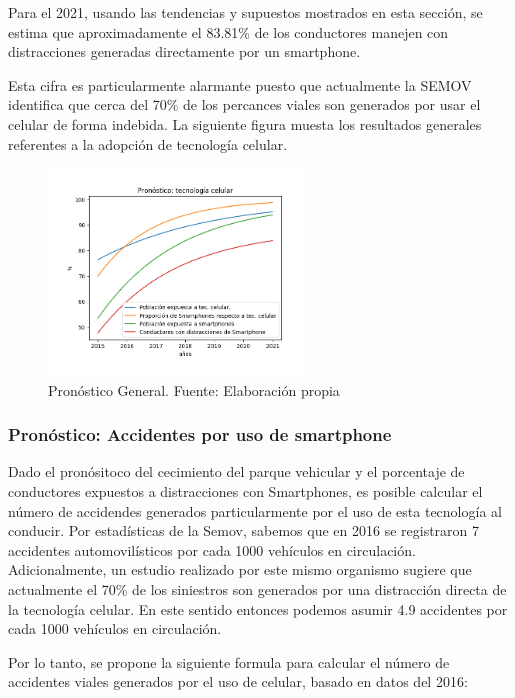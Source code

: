 \documentclass{article}
\begin{document}
Para el 2021, usando las tendencias y supuestos mostrados en esta sección, se estima
que aproximadamente el 83.81\% de los conductores manejen con distracciones generadas
directamente por un smartphone.

Esta cifra es particularmente alarmante puesto que actualmente la SEMOV identifica
que cerca del 70\% de los percances viales son generados por usar el celular de
forma indebida. La siguiente figura muesta los resultados generales referentes a la adopción de
tecnología celular.

	\begin{figure}[H]\centering
	\includegraphics[width=0.6\textwidth]{resources/img/smartphone_complete_forecast.png}
	\caption{\label{fig:compare_forecast} Pronóstico General. Fuente: Elaboración propia}
    \end{figure}

\subsubsection{Pronóstico: Accidentes por uso de smartphone}

Dado el pronósitoco del cecimiento del parque vehicular y el porcentaje de conductores expuestos a
distracciones con Smartphones, es posible calcular el número de accidendes generados particularmente
por el uso de esta tecnología al conducir. Por estadísticas de la Semov, sabemos que en 2016 se registraron 7
accidentes automovilísticos por cada 1000 vehículos en circulación. Adicionalmente, un estudio realizado por este
mismo organismo sugiere que actualmente el 70\% de los siniestros son generados por una distracción directa de la
tecnología celular. En este sentido entonces podemos asumir 4.9 accidentes por cada 1000 vehículos en circulación.

Por lo tanto, se propone la siguiente formula para calcular el número de accidentes viales generados por el uso
de celular, basado en datos del 2016:
\end{document}
